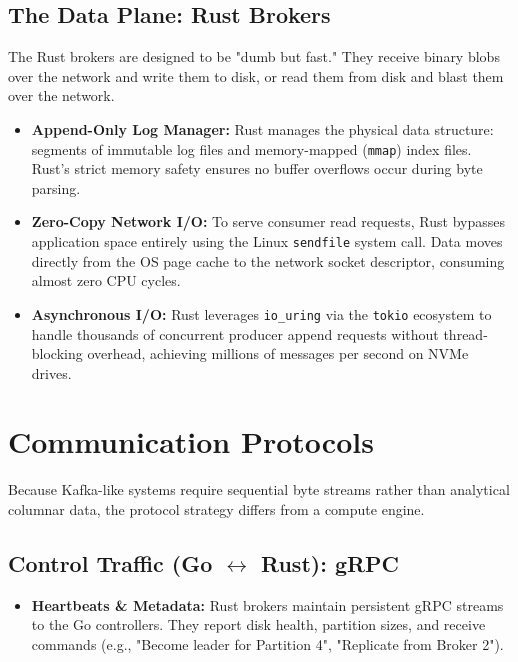 \documentclass[11pt, a4paper]{article}
\begin{document}
\subsection{The Data Plane: Rust Brokers}
The Rust brokers are designed to be "dumb but fast." They receive binary blobs over the network and write them to disk, or read them from disk and blast them over the network.

\begin{itemize}
    \item \textbf{Append-Only Log Manager:} Rust manages the physical data structure: segments of immutable log files and memory-mapped (\texttt{mmap}) index files. Rust's strict memory safety ensures no buffer overflows occur during byte parsing.
    \item \textbf{Zero-Copy Network I/O:} To serve consumer read requests, Rust bypasses application space entirely using the Linux \texttt{sendfile} system call. Data moves directly from the OS page cache to the network socket descriptor, consuming almost zero CPU cycles.
    \item \textbf{Asynchronous I/O:} Rust leverages \texttt{io\_uring} via the \texttt{tokio} ecosystem to handle thousands of concurrent producer append requests without thread-blocking overhead, achieving millions of messages per second on NVMe drives.
\end{itemize}

\section{Communication Protocols}

Because Kafka-like systems require sequential byte streams rather than analytical columnar data, the protocol strategy differs from a compute engine.

\subsection{Control Traffic (Go $\leftrightarrow$ Rust): gRPC}
\begin{itemize}
    \item \textbf{Heartbeats \& Metadata:} Rust brokers maintain persistent gRPC streams to the Go controllers. They report disk health, partition sizes, and receive commands (e.g., "Become leader for Partition 4", "Replicate from Broker 2").
\end{itemize}
\end{document}
